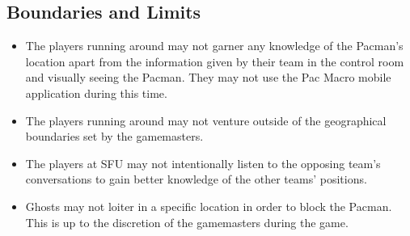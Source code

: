 \documentclass[10pt, oneside, letterpaper, titlepage]{article}
\begin{document}
	\subsection{Boundaries and Limits}
	\label{subsec:gameplay:boundaries-and-limits}

	\begin{itemize}
		\item The players running around may not garner any knowledge of the Pacman's location apart from the information given by their team in the control room and visually seeing the Pacman. They may not use the Pac Macro mobile application during this time.
		\item The players running around may not venture outside of the geographical boundaries set by the gamemasters.
		\item The players at SFU may not intentionally listen to the opposing team's conversations to gain better knowledge of the other teams' positions.
		\item Ghosts may not loiter in a specific location in order to block the Pacman. This is up to the discretion of the gamemasters during the game.
	\end{itemize}
\end{document}
